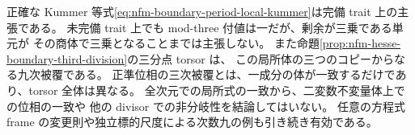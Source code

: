 \begin{remark}[局所式の範囲と異なる二つの被覆]
正確な Kummer 等式\eqref{eq:nfm-boundary-period-local-kummer}は完備 trait 上の主張である。
未完備 trait 上でも mod-three 付値は一だが、剰余が三乗である単元が
その商体で三乗となることまでは主張しない。
また命題\ref{prop:nfm-hesse-boundary-third-division}の三分点 torsor は、
この局所体の三つのコピーからなる九次被覆である。
正準位相の三次被覆とは、一成分の体が一致するだけであり、torsor 全体は異なる。
全次元での局所式の一致から、二変数不変量体上での位相の一致や
他の divisor での非分岐性を結論してはいない。
任意の方程式 frame の変更則や独立標的尺度による次数九の例も引き続き有効である。
\end{remark}

